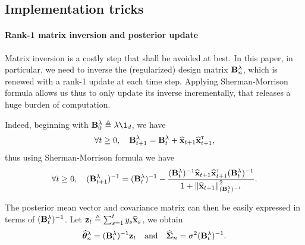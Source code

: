 
\subsection{Implementation tricks}\label{sec:lgc.experiments.tricks}

\paragraph{Rank-1 matrix inversion and posterior update}

Matrix inversion is a costly step that shall be avoided at best. In this paper, in particular, we need to inverse the (regularized) design matrix ${\bf B}^{\lambda}_n$, which is renewed with a rank-1 update at each time step. Applying Sherman-Morrison formula allows us thus to only update its inverse incrementally, that releases a huge burden of computation.

Indeed, beginning with $\bB^{\lambda}_0 \eqdef \lambda\1_d$, we have
\[
    \forall t\geq 0, \quad {\bf B}^{\lambda}_{t+1} = {\bf B}^{\lambda}_t + \widehat{{\bf x}}_{t+1}\widehat{{\bf x}}_{t+1}^\mathsf{\scriptscriptstyle T},
\]
thus using Sherman-Morrison formula we have
\[
    \forall t\geq 0, \quad ({\bf B}^{\lambda}_{t+1})^{-1} = ({\bf B}^{\lambda}_t)^{-1} - \frac{({\bf B}^{\lambda}_t)^{-1}\widehat{{\bf x}}_{t+1}\widehat{{\bf x}}_{t+1}^\mathsf{\scriptscriptstyle T}({\bf B}^{\lambda}_t)^{-1}}{1+\left\lVert\widehat{{\bf x}}_{t+1}\right\rVert_{({\bf B}^{\lambda}_t)^{-1}}^2}.
\]

The posterior mean vector and covariance matrix can then be easily expressed in terms of $({\bf B}^{\lambda}_t)^{-1}$. Let ${\bf z}_t \triangleq \sum_{s=1}^t y_s\widehat{{\bf x}}_s$, we obtain
\[
    \widehat{{\boldsymbol \theta}}_n^{\lambda} = ({\bf B}^{\lambda}_t)^{-1}{\bf z}_t \quad \text{and} \quad \widehat{{\boldsymbol \Sigma}}_n = \sigma^2 ({\bf B}^{\lambda}_t)^{-1}.
\]

